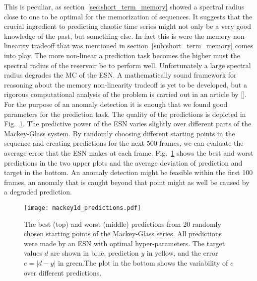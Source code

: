 This is peculiar, as section~\ref{sec:short_term_memory} showed a spectral
radius close to one to be optimal for the memorization of sequences.  It
suggests that the crucial ingredient to predicting chaotic time series might
not only be a very good knowledge of the past, but something else. In fact this
is were the memory non-linearity tradeoff that was mentioned in
section~\ref{sub:short_term_memory} comes into play.  The more non-linear a
prediction task becomes the higher must the spectral radius of the reservoir be
to perform well. Unfortunately a large spectral radius degrades the MC of the
ESN. A mathematically sound framework for reasoning about the memory
non-linearity tradeoff is yet to be developed, but a rigorous computational
analysis of the problem is carried out in an article by [\cite{verstraeten2010}].
For the purpose of an anomaly detection it is enough that we found good
parameters for the prediction task. The quality of the predictions is depicted
in Fig.~\ref{fig:mackey1d_predictions}.
The predictive power of the ESN varies slightly over different parts of the
Mackey-Glass system. By randomly choosing different starting points in the
sequence and creating predictions for the next 500 frames, we can evaluate the
average error that the ESN makes at each frame.
Fig.~\ref{fig:mackey1d_predictions} shows the best and worst predictions in the
two upper plots and the average deviation of prediction and target in the
bottom.  An anomaly detection might be feasible within the first 100 frames, an
anomaly that is caught beyond that point might as well be caused by a degraded
prediction.\\

\begin{figure}
  \centering
  \texttt{[image: mackey1d\_predictions.pdf]}
  \caption{The best (top) and worst (middle) predictions from 20 randomly
    chosen starting points of the Mackey-Glass series. All predictions were
    made by an ESN with optimal hyper-parameters.  The target values $d$ are
    shown in blue, prediction $y$ in yellow, and the error $e = |d - y|$ in
    green.The plot in the bottom shows the variability of $e$ over different
    predictions.
  }
  \label{fig:mackey1d_predictions}
\end{figure}


